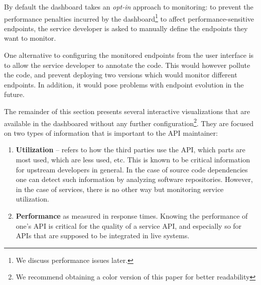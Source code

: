  By default the dashboard takes an {\em opt-in} approach to monitoring: to prevent the performance penalties incurred by the dashboard\footnote{We discuss performance issues later.} to affect performance-sensitive endpoints, the service developer is asked to manually define the endpoints they want to monitor. 
   

  One alternative to configuring the monitored endpoints from the user interface is to allow the service developer to annotate the code. This would however pollute the code, and prevent deploying two versions which would monitor different endpoints. In addition, it would pose problems with endpoint evolution in the future.

  
\niceseparator

  The remainder of this section presents several interactive
  visualizations that are available in the dashboared without any further configuration\footnote{We recommend obtaining a color version of this paper for better readability}. They are focused on two types of information that is important to the API maintainer: 

  \begin{enumerate}

    \item {\bf Utilization} -- refers to how the third parties use the API, which parts are most used, which are less used, etc. This is known to be critical information for upstream developers in general\cite{Haen14a}. In the case of source code dependencies one can detect such information by analyzing software repositories. However, in the case of services, there is no other way but monitoring service utilization. 

    \item {\bf Performance} as measured in response times. Knowing the performance of one's API is critical for the quality of a service API, and especially so for APIs that are supposed to be integrated in live systems. 

  \end{enumerate}
